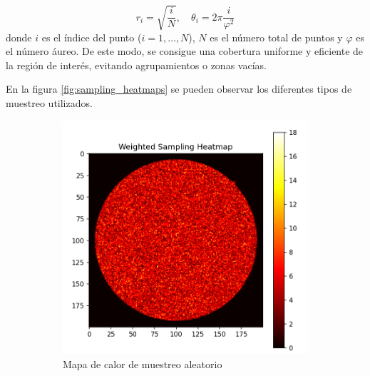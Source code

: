 \[
r_i = \sqrt{\frac{i}{N}}, \quad \theta_i = 2\pi \frac{i}{\varphi^2}
\]
donde $i$ es el índice del punto ($i = 1, \dots, N$), $N$ es el número total de puntos y $\varphi$ es el número áureo. De este modo, se consigue una cobertura uniforme y eficiente de la región de interés, evitando agrupamientos o zonas vacías.

En la figura \ref{fig:sampling_heatmaps} se pueden observar los diferentes tipos de muestreo utilizados.

\begin{figure}[tbp]
    \centering
    \begin{subfigure}[b]{0.3\textwidth}
        \centering
        \includegraphics[width=\textwidth]{imaxes/muestraje/random_sampling_heatmap.png}
        \caption{Mapa de calor de muestreo aleatorio}
        \label{fig:random_sampling_heatmap}
    \end{subfigure}
    \hfill
    \begin{subfigure}[b]{0.3\textwidth}
        \centering

\end{subfigure}
\end{figure}
